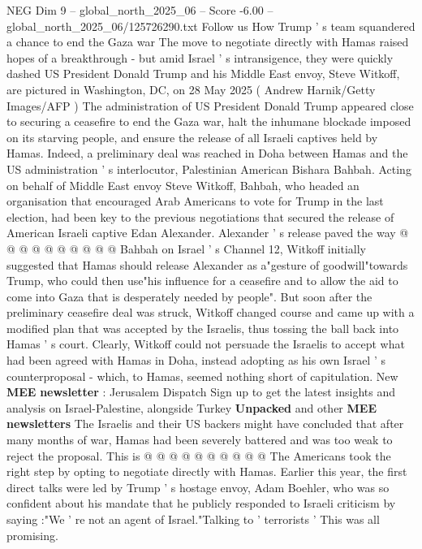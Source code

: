 \begin{textsample}{NEG Dim 9 – global\_north\_2025\_06 – Score -6.00 – global\_north\_2025\_06/125726290.txt}  \label{ex:f9_neg_080}
Follow us How Trump ' s team squandered a chance to end the Gaza war The move to negotiate directly with Hamas raised hopes of a breakthrough - but amid Israel ' s intransigence, they were quickly dashed US President Donald Trump and his Middle East envoy, Steve Witkoff, are pictured in Washington, DC, on 28 May 2025 ( Andrew Harnik/Getty Images/AFP ) The administration of US President Donald Trump appeared close to securing a ceasefire to end the Gaza war, halt the inhumane blockade imposed on its starving people, and ensure the release of all Israeli captives held by Hamas.
Indeed, a preliminary deal was reached in Doha between Hamas and the US administration ' s interlocutor, Palestinian American Bishara Bahbah.
Acting on behalf of Middle East envoy Steve Witkoff, Bahbah, who headed an organisation that encouraged Arab Americans to vote for Trump in the last election, had been key to the previous negotiations that secured the release of American Israeli captive Edan Alexander.
Alexander ' s release paved the way @ @ @ @ @ @ @ @ @ @ Bahbah on Israel ' s Channel 12, Witkoff initially suggested that Hamas should release Alexander as a"gesture of goodwill"towards Trump, who could then use"his influence for a ceasefire and to allow the aid to come into Gaza that is desperately needed by people".
But soon after the preliminary ceasefire deal was struck, Witkoff changed course and came up with a modified plan that was accepted by the Israelis, thus tossing the ball back into Hamas ' s court.
Clearly, Witkoff could not persuade the Israelis to accept what had been agreed with Hamas in Doha, instead adopting as his own Israel ' s counterproposal - which, to Hamas, seemed nothing short of capitulation.
New \textbf{MEE} \textbf{newsletter} : Jerusalem Dispatch Sign up to get the latest insights and analysis on Israel-Palestine, alongside Turkey \textbf{Unpacked} and other \textbf{MEE} \textbf{newsletters} The Israelis and their US backers might have concluded that after many months of war, Hamas had been severely battered and was too weak to reject the proposal.
This is @ @ @ @ @ @ @ @ @ @ The Americans took the right step by opting to negotiate directly with Hamas.
Earlier this year, the first direct talks were led by Trump ' s hostage envoy, Adam Boehler, who was so confident about his mandate that he publicly responded to Israeli criticism by saying :"We ' re not an agent of Israel."Talking to ' terrorists ' This was all promising.

\end{textsample}

